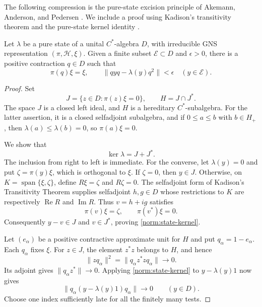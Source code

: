 The following compression is the pure-state excision principle of
Akemann, Anderson, and Pedersen \cite[Proposition~2.2]{AAP1986}.
We include a proof using Kadison's transitivity theorem and the
pure-state kernel identity \cite[Theorem~1 and Corollary~2]{Kadison1957}.

\begin{lemma}\label{norm:excision}
Let \(\lambda\) be a pure state of a unital \(C^*\)-algebra \(D\), with
irreducible GNS representation \((\pi,\mathcal H,\xi)\).
Given a finite subset \(\mathcal E\subset D\) and \(\epsilon>0\), there
is a positive contraction \(q\in D\) such that
\[
 \pi(q)\xi=\xi,\qquad
 \|qyq-\lambda(y)q^2\|<\epsilon\quad(y\in\mathcal E).
\]
\end{lemma}

\begin{proof}
Set
\[
 J=\{z\in D:\pi(z)\xi=0\},\qquad H=J\cap J^*.
\]
The space \(J\) is a closed left ideal, and \(H\) is a hereditary
\(C^*\)-subalgebra.  For the latter assertion, it is a closed
selfadjoint subalgebra, and if \(0\le a\le b\) with \(b\in H_+\), then
\(\lambda(a)\le\lambda(b)=0\), so \(\pi(a)\xi=0\).

We show that
\begin{equation}\label{norm:state-kernel}
 \ker\lambda=J+J^*.
\end{equation}
The inclusion from right to left is immediate.  For the converse,
let \(\lambda(y)=0\) and put \(\zeta=\pi(y)\xi\), which is orthogonal
to \(\xi\).  If \(\zeta=0\), then \(y\in J\).  Otherwise, on
\(K=\operatorname{span}\{\xi,\zeta\}\), define \(R\xi=\zeta\) and
\(R\zeta=0\).  The selfadjoint form of Kadison's Transitivity Theorem
\cite{Kadison1957} supplies selfadjoint \(h,g\in D\) whose restrictions
to \(K\) are respectively \(\operatorname{Re}R\) and
\(\operatorname{Im}R\).  Thus \(v=h+ig\) satisfies
\[
 \pi(v)\xi=\zeta,\qquad \pi(v^*)\xi=0.
\]
Consequently \(y-v\in J\) and \(v\in J^*\), proving
\eqref{norm:state-kernel}.

Let \((e_\alpha)\) be a positive contractive approximate unit for \(H\)
and put \(q_\alpha=1-e_\alpha\).  Each \(q_\alpha\) fixes \(\xi\).
For \(z\in J\), the element \(z^*z\) belongs to \(H\), and hence
\[
 \|zq_\alpha\|^2
   =\|q_\alpha z^*zq_\alpha\|\longrightarrow0.
\]
Its adjoint gives \(\|q_\alpha z^*\|\to0\).  Applying
\eqref{norm:state-kernel} to \(y-\lambda(y)1\) now gives
\[
 \|q_\alpha(y-\lambda(y)1)q_\alpha\|\longrightarrow0
 \qquad(y\in D).
\]
Choose one index sufficiently late for all the finitely many tests.
\end{proof}

